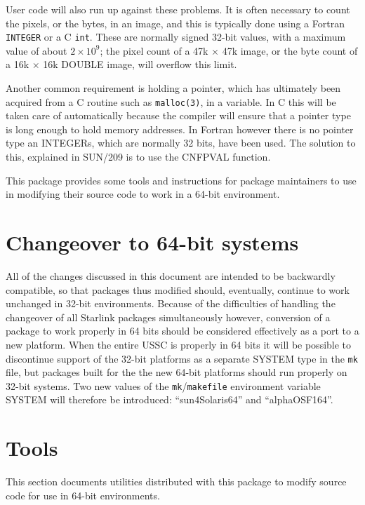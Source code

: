 \documentclass[twoside,11pt]{article}
\newcommand{\xref}[3]{#1}
\renewcommand{\_}{\texttt{\symbol{95}}}
\begin{document}
User code will also run up against these problems.
It is often necessary to count the pixels, or the bytes,
in an image, and this is typically done using a Fortran {\tt INTEGER}
or a C {\tt int}.  These are normally signed 32-bit values, with
a maximum value of about $2 \times 10^9$; the pixel count of a 
47k $\times$ 47k image, or the byte count of a 16k $\times$ 16k 
\_DOUBLE image, will overflow this limit.

Another common requirement is holding a pointer, which has ultimately been 
acquired from a C routine such as {\tt malloc(3)}, 
in a variable.
In C this will be taken care of automatically because the compiler
will ensure that a pointer type is long enough to hold memory addresses.
In Fortran however there is no pointer type an INTEGERs, which are
normally 32 bits, have been used.
The solution to this, explained in \xref{SUN/209}{sun209}{pointers}
is to use the \xref{CNF\_PVAL}{sun209}{CNF\_PVAL} function.

This package provides some tools and instructions for 
package maintainers to use 
in modifying their source code to work in a 64-bit environment.

\section{Changeover to 64-bit systems}

All of the changes discussed in this document
are intended to be backwardly compatible, 
so that packages thus modified should, eventually, 
continue to work unchanged in 32-bit environments.
Because of the difficulties of handling the changeover of all 
Starlink packages simultaneously however, conversion of a package
to work properly in 64 bits should be considered effectively as
a port to a new platform.  
When the entire USSC is properly in 64 bits it will be possible
to discontinue support of the 32-bit platforms as a separate SYSTEM
type in the {\tt mk} file, but packages built for the the new 
64-bit platforms should run properly on 32-bit systems.
Two new values of the {\tt mk}/{\tt makefile} environment variable 
SYSTEM will therefore be introduced: 
``sun4\_Solaris\_64'' and ``alpha\_OSF1\_64''.


\section{Tools}

This section documents utilities distributed with this package
to modify source code for use in 64-bit environments.
\end{document}
